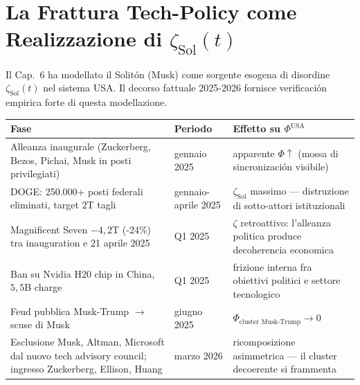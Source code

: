 \section{\texorpdfstring{La Frattura Tech-Policy come Realizzazione di
\(\zeta_{\text{Sol}}(t)\)}{La Frattura Tech-Policy come Realizzazione di \textbackslash zeta\_\{\textbackslash text\{Sol\}\}(t)}}\label{la-frattura-tech-policy-come-realizzazione-di-zeta_textsolt}

Il Cap.~6 ha modellato il Solitón (Musk) come sorgente esogena di
disordine \(\zeta_{\text{Sol}}(t)\) nel sistema USA. Il decorso fattuale
2025-2026 fornisce verificación empirica forte di questa modellazione.

{\def\LTcaptype{none} %
{\small\begin{longtable}[]{@{}
  >{\raggedright\arraybackslash}p{}
  >{\raggedright\arraybackslash}p{}
  >{\raggedright\arraybackslash}p{}@{}}
\toprule\noalign{}
\begin{minipage}[b]{\linewidth}\raggedright
Fase
\end{minipage} & \begin{minipage}[b]{\linewidth}\raggedright
Periodo
\end{minipage} & \begin{minipage}[b]{\linewidth}\raggedright
Effetto su \(\Phi^{\text{USA}}\)
\end{minipage} \\
\midrule\noalign{}
\endhead
\bottomrule\noalign{}
\endlastfoot
Alleanza inaugurale (Zuckerberg, Bezos, Pichai, Musk in posti
privilegiati) & 20 gennaio 2025 & apparente \(\Phi \uparrow\) (mossa di
sincronización visibile) \\
DOGE: 250.000+ posti federali eliminati, target \(2\)T tagli &
gennaio-aprile 2025 & \(\zeta_{\text{Sol}}\) massimo --- distruzione di
sotto-attori istituzionali \\
Magnificent Seven \(-4{,}2\)T (-24\%) tra inauguration e 21 aprile 2025
& Q1 2025 & \(\zeta\) retroattivo: l'alleanza politica produce
decoherencia economica \\
Ban su Nvidia H20 chip in China, \(5{,}5\)B charge & Q1 2025 & frizione
interna fra obiettivi politici e settore tecnologico \\
Feud pubblica Musk-Trump $\to$ scuse di Musk & giugno 2025 &
\(\Phi_{\text{cluster Musk-Trump}} \to 0\) \\
Esclusione Musk, Altman, Microsoft dal nuovo tech advisory council;
ingresso Zuckerberg, Ellison, Huang & marzo 2026 & ricomposizione
asimmetrica --- il cluster decoerente si frammenta \\
\end{longtable}}
}

